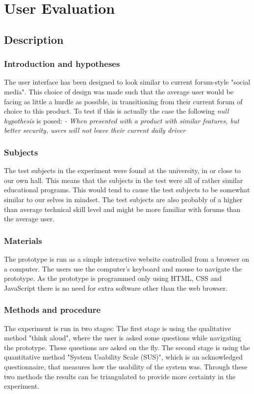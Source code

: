 \section{User Evaluation}
\subsection{Description}

\subsubsection{Introduction and hypotheses}
The user interface has been designed to look similar to current forum-style "social media". This choice of design was made such that the average user would be facing as little a hurdle as possible, in transitioning from their current forum of choice to this product. To test if this is actually the case the following \textit{null hypothesis} is posed:\newline
\textit{ - When presented with a product with similar features, but better security, users will not leave their current daily driver}

\subsubsection{Subjects}
The test subjects in the experiment were found at the university, in or close to our own hall. This means that the subjects in the test were all of rather similar educational programs. This would tend to cause the test subjects to be somewhat similar to our selves in mindset. The test subjects are also probably of a higher than average technical skill level and might be more familiar with forums than the average user.

\subsubsection{Materials}
The prototype is run as a simple interactive website controlled from a browser on a computer. The users use the computer's keyboard and mouse to navigate the prototype. As the prototype is programmed only using HTML, CSS and JavaScript there is no need for extra software other than the web browser.

\subsubsection{Methods and procedure}
\label{procedure}
The experiment is run in two stages: The first stage is using the qualitative method "think aloud", where the user is asked some questions while navigating the prototype. These questions are asked on the fly. The second stage is using the quantitative method "System Usability Scale (SUS)", which is an acknowledged questionnaire, that measures how the usability of the system was. Through these two methods the results can be triangulated to provide more certainty in the experiment.

